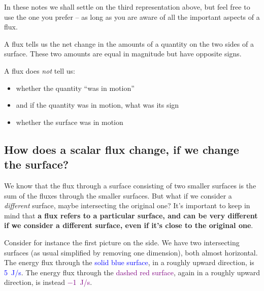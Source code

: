 \documentclass[a4paper,12pt,%
onecolumn,oneside,titlepage,%
british%
]{memoir}
\renewcommand*{\|}[1][]{\nonscript\:#1\vert\nonscript\:\mathopen{}}
\begin{document}
In these notes we shall settle on the third representation above, but feel free to use the one you prefer -- as long as you are aware of all the important aspects of a flux.
\begin{warning}
  A flux tells us the net change in the amounts of a quantity on the two sides of a surface. These two amounts are equal in magnitude but have opposite signs.

  \smallskip

  A flux does \emph{not} tell us:
  \begin{itemize}[nosep]
  \item whether the quantity \enquote{was in motion}
  \item \textellipsis and if the quantity was in motion, what was its sign
  \item whether the surface was in motion
  \end{itemize}
\end{warning}

\subsection{How does a scalar flux change, if we change the surface?}
\label{sec:surface_change_scalar}

We know that the flux through a surface consisting of two smaller surfaces is the sum of the fluxes through the smaller surfaces. But what if we consider a \emph{different} surface, maybe intersecting the original one? It's important to keep in mind that \textbf{a flux refers to a particular surface, and can be very different if we consider a different surface, even if it's close to the original one}.


Consider for instance the first picture on the side.
%
%
We have two intersecting surfaces (as usual simplified by removing one dimension), both almost horizontal. The energy flux through the \textcolor{blue}{solid blue surface}, in a roughly upward direction, is \textcolor{blue}{\qty{+5}{J/s}}. The energy flux through the \textcolor{purple}{dashed red surface}, again in a roughly upward direction, is instead \textcolor{purple}{\qty{-1}{J/s}}.
\end{document}
